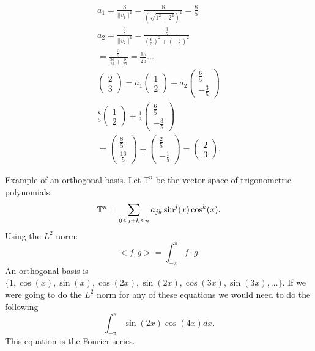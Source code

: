   \begin{align*}
    a_1=\frac{8}{| | v_1| |^2}=\frac{8}{(\sqrt{1^2+2^2} )^2}=\frac{8}{5}\\
    a_2=\frac{\frac{3}{5}}{| | v_2 | |^2}=\frac{\frac{3}{5}}{\left(\frac{6}{5}\right)^2+\left(-\frac{3}{5}\right)^2}\\
    =\frac{\frac{3}{5}}{\frac{36}{25}+\frac{9}{25}}=\frac{15}{25}\ldots\\
    \begin{pmatrix} 2\\3 \end{pmatrix} =a_1\begin{pmatrix} 1\\2 \end{pmatrix} +a_2\begin{pmatrix} \frac{6}{5}\\-\frac{3}{5} \end{pmatrix} \\
    \frac{8}{5}\begin{pmatrix} 1\\2 \end{pmatrix} + \frac{1}{3}\begin{pmatrix} \frac{6}{5}\\-\frac{3}{5} \end{pmatrix} \\
    =\begin{pmatrix} \frac{8}{5}\\\frac{16}{5} \end{pmatrix} +\begin{pmatrix} \frac{2}{5}\\-\frac{1}{5} \end{pmatrix} =\begin{pmatrix} 2\\3 \end{pmatrix} 
  .\end{align*}

  \begin{problem}
    Example of an orthogonal basis. Let $\mathbb{T}^{n}$ be the vector space of trigonometric polynomials.
    \[
      \mathbb{T}^{n}=\sum_{0\le j+k\le n}a_{jk}\sin^{j}(x)\cos^k(x)\\
    .\] 
    Using the $L^2$ norm:
    \[
      <f,g> = \int_{-\pi}^{\pi}f\cdot g
    .\] 
    An orthogonal basis is $\{1,\cos(x),\sin(x),\cos(2x),\sin(2x),\cos(3x),\sin(3x),\ldots\}$. If we were going to do the $L^2$ norm for any of these equations we would need to do the following
    \[
      \int_{-\pi}^{\pi}\sin(2x)\cos(4x)dx
    .\] 
    This equation is the Fourier series.
  \end{problem}

